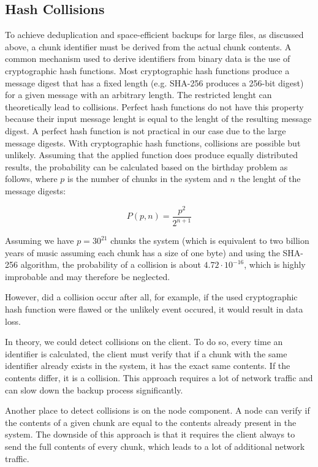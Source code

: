 \subsection{Hash Collisions}\label{sec:hash-collisions}
To achieve deduplication and space-efficient backups for large files, as discussed above, a chunk identifier must be derived from the actual chunk contents. 
A common mechanism used to derive identifiers from binary data is the use of cryptographic hash functions. Most cryptographic hash functions produce a message digest that has a fixed length (e.g. SHA-256\cite{sha-256} produces a 256-bit digest) for a given message with an arbitrary length. The restricted lenght can theoretically lead to collisions.
Perfect hash functions do not have this property because their input message lenght is equal to the lenght of the resulting message digest. A perfect hash function is not practical in our case due to the large message digests.
With cryptographic hash functions, collisions are possible but unlikely. Assuming that the applied function does produce equally distributed results, the probability can be calculated based on the birthday problem\cite{birthday-attack} as follows, where $p$ is the number of chunks in the system and $n$ the lenght of the message digests:

\[
P(p, n) = \frac{p^2}{2^{n+1}}
\]

Assuming we have $p=30^{21}$ chunks the system (which is equivalent to two billion years of music assuming each chunk has a size of one byte\cite{seagate-zetabyte}) and using the SHA-256 algorithm, the probability of a collision is about $4.72 \cdot 10^{-16}$, which is highly improbable and may therefore be neglected.

However, did a collision occur after all, for example, if the used cryptographic hash function were flawed or the unlikely event occured, it would result in data loss.

In theory, we could detect collisions on the \gls{client}. To do so, every time an identifier is calculated, the \gls{client} must verify that if a chunk with the same identifier already exists in the system, it has the exact same contents. If the contents differ, it is a collision. This approach requires a lot of network traffic and can slow down the backup process significantly.

Another place to detect collisions is on the \gls{node} component. A \gls{node} can verify if the contents of a given chunk are equal to the contents already present in the system. The downside of this approach is that it requires the \gls{client} always to send the full contents of every chunk, which leads to a lot of additional network traffic.

